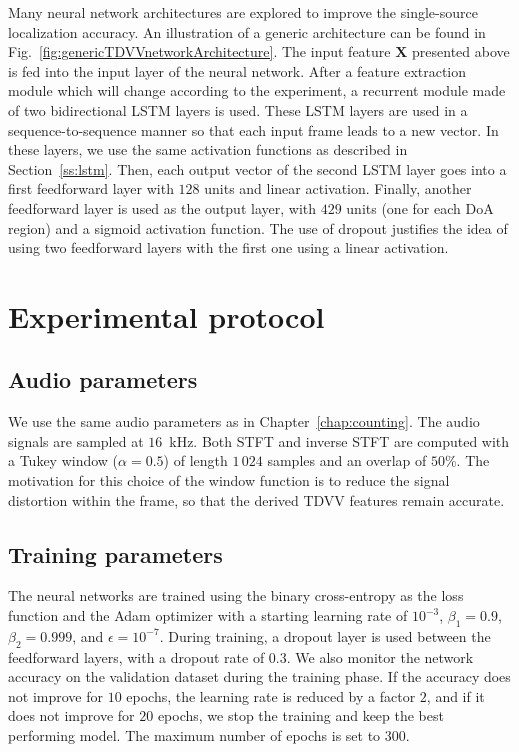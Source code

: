 Many neural network architectures are explored to improve the single-source localization accuracy. An illustration of a generic architecture can be found in Fig.~\ref{fig:genericTDVVnetworkArchitecture}. The input feature $\mathbf{X}$ presented above is fed into the input layer of the neural network. After a feature extraction module which will change according to the experiment, a recurrent module made of two bidirectional LSTM layers is used. These LSTM layers are used in a sequence-to-sequence manner so that each input frame leads to a new vector. In these layers, we use the same activation functions as described in Section~\ref{ss:lstm}. Then, each output vector of the second LSTM layer goes into a first feedforward layer with $128$ units and linear activation. Finally, another feedforward layer is used as the output layer, with $429$ units (one for each DoA region) and a sigmoid activation function. The use of dropout justifies the idea of using two feedforward layers with the first one using a linear activation.


\section{Experimental protocol}

\subsection{Audio parameters}

We use the same audio parameters as in Chapter~\ref{chap:counting}. The audio signals are sampled at $16$~kHz. Both STFT and inverse STFT are computed with a Tukey window ($\alpha = 0.5$) of length $1\,024$ samples and an overlap of $50$\%. The motivation for this choice of the window function is to reduce the signal distortion within the frame, so that the derived TDVV features remain accurate.

\subsection{Training parameters}

The neural networks are trained using the binary cross-entropy as the loss function and the Adam optimizer with a starting learning rate of $10^{-3}$, $\beta_1 = 0.9$, $\beta_2=0.999$, and $\epsilon = 10^{-7}$. During training, a dropout layer is used between the feedforward layers, with a dropout rate of $0.3$. We also monitor the network accuracy on the validation dataset during the training phase. If the accuracy does not improve for $10$ epochs, the learning rate is reduced by a factor $2$, and if it does not improve for $20$ epochs, we stop the training and keep the best performing model. The maximum number of epochs is set to $300$.

